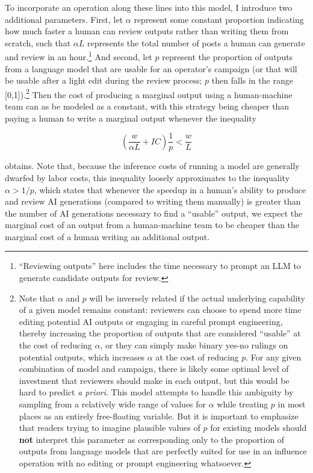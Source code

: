 \documentclass{article}
\begin{document}
To incorporate an operation along these lines into this model, I introduce two additional parameters. First, let $\alpha$ represent some constant proportion indicating how much faster a human can review outputs rather than writing them from scratch, such that $\alpha L$ represents the total number of posts a human can generate and review in an hour.\footnote{``Reviewing outputs'' here includes the time necessary to prompt an LLM to generate candidate outputs for review.} And second, let $p$ represent the proportion of outputs from a language model that are usable for an operator's campaign (or that will be usable after a light edit during the review process; $p$ then falls in the range [0,1]).\footnote{Note that $\alpha$ and $p$ will be inversely related if the actual underlying capability of a given model remains constant: reviewers can choose to spend more time editing potential AI outputs or engaging in careful prompt engineering, thereby increasing the proportion of outputs that are considered ``usable'' at the cost of reducing $\alpha$, or they can simply make binary yes-no rulings on potential outputs, which increases $\alpha$ at the cost of reducing $p$. For any given combination of model and campaign, there is likely some optimal level of investment that reviewers should make in each output, but this would be hard to predict \textit{a priori}. This model attempts to handle this ambiguity by sampling from a relatively wide range of values for $\alpha$ while treating $p$ in most places as an entirely free-floating variable. But it is important to emphasize that readers trying to imagine plausible values of $p$ for existing models should \textbf{not} interpret this parameter as corresponding only to the proportion of outputs from language models that are perfectly suited for use in an influence operation with no editing or prompt engineering whatsoever.} Then the cost of producing a marginal output using a human-machine team can as be modeled as a constant, with this strategy being cheaper than paying a human to write a marginal output whenever the inequality 

\begin{equation}
  \left( \frac{w}{\alpha L} + IC \right) \frac{1}{p} < \frac{w}{L}
  \label{eq:inequality}
\end{equation}

obtains. Note that, because the inference costs of running a model are generally dwarfed by labor costs, this inequality loosely approximates to the inequality $\alpha > 1/p$, which states that whenever the speedup in a human's ability to produce and review AI generations (compared to writing them manually) is greater than the number of AI generations necessary to find a ``usable'' output, we expect the marginal cost of an output from a human-machine team to be cheaper than the marginal cost of a human writing an additional output. 
\end{document}
